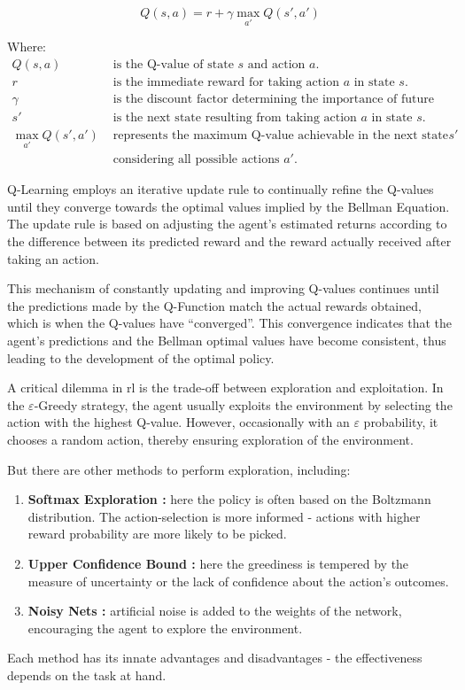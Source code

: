 \documentclass[12pt,a4paper,openright,twoside]{book}
\begin{document}
\begin{equation}
    Q(s, a) = r + \gamma \max_{a'} Q(s', a')
    \label{eq:q_learning}
\end{equation}

Where:
\begin{align*}
    Q(s, a) & \text{ is the Q-value of state } s \text{ and action } a. \\
    r & \text{ is the immediate reward for taking action } a \text{ in state } s. \\
    \gamma & \text{ is the discount factor determining the importance of future rewards.} \\
    s' & \text{ is the next state resulting from taking action } a \text{ in state } s. \\
    \max_{a'} Q(s', a') & \text{ represents the maximum Q-value achievable in the next state } s' \\
    & \text{ considering all possible actions } a'.
\end{align*}

Q-Learning employs an iterative update rule to continually refine the Q-values 
until they converge towards the optimal values implied by the Bellman Equation. 
The update rule is based on adjusting the agent's estimated returns according to 
the difference between its predicted reward and the 
reward actually received after taking an action.

This mechanism of constantly updating and improving Q-values continues until the 
predictions made by the Q-Function match the actual rewards obtained, which is 
when the Q-values have ``converged''. This convergence indicates that the agent's 
predictions and the Bellman optimal values have become consistent, thus leading 
to the development of the optimal policy.

A critical dilemma in \ac{rl} is the trade-off between exploration and exploitation. 
In the $\varepsilon$-Greedy strategy, the agent usually exploits the environment by selecting the action with the highest Q-value. However, occasionally with an $\varepsilon$ probability, it chooses a random action, thereby ensuring exploration of the environment.

But there are other methods to perform exploration, including:
\begin{enumerate}
    \item \textbf{Softmax Exploration \cite{softmax-exploration}:} here the policy is often based on the Boltzmann distribution. The action-selection is more informed - actions with higher reward probability are more likely to be picked.
    \item \textbf{Upper Confidence Bound \cite{10.5555/944919.944941}:} here the greediness is tempered by the measure of uncertainty or the lack of confidence about the action's outcomes.
    \item \textbf{Noisy Nets \cite{fortunato2019noisy}:} artificial noise is added to the weights of the network, encouraging the agent to explore the environment.
\end{enumerate}
Each method has its innate advantages and disadvantages - the effectiveness depends on the task at hand. 
\end{document}
